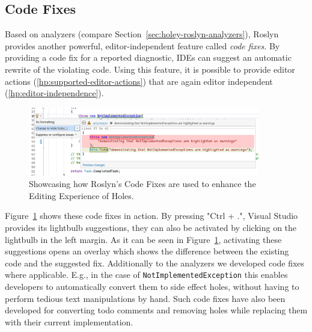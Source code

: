 \subsection{Code Fixes}
\label{sec:holey-code-fixes}
Based on analyzers (compare Section~\ref{sec:holey-roslyn-analyzers}), Roslyn provides another powerful, editor-independent feature called \emph{code fixes}.
By providing a code fix for a reported diagnostic, IDEs can suggest an automatic rewrite of the violating code.
Using this feature, it is possible to provide editor actions (\ref{hp:supported-editor-actions}) that are again editor independent (\ref{hp:editor-independence}).

\begin{figure}[ht]
    \centering
    \includegraphics[width=0.9\textwidth]{images/code-fixes}
    \caption{Showcasing how Roslyn's Code Fixes are used to enhance the Editing Experience of Holes.}
    \label{fig:holey-code-fixes}
\end{figure}

Figure~\ref{fig:holey-code-fixes} shows these code fixes in action.
By pressing "Ctrl + .", Visual Studio provides its lightbulb suggestions, they can also be activated by clicking on the lightbulb in the left margin.
As it can be seen in Figure~\ref{fig:holey-code-fixes}, activating these suggestions opens an overlay which shows the difference between the existing code and the suggested fix.
Additionally to the analyzers we developed code fixes where applicable.
E.g., in the case of \verb|NotImplementedException| this enables developers to automatically convert them to side effect holes, without having to perform tedious text manipulations by hand.
Such code fixes have also been developed for converting todo comments and removing holes while replacing them with their current implementation.

